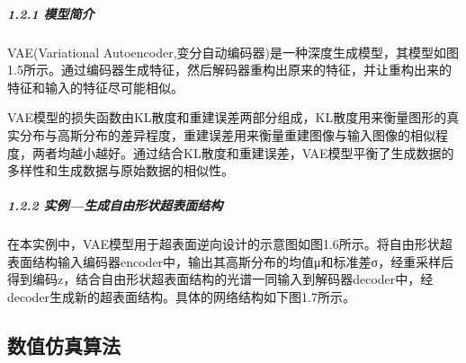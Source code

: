 \documentclass[a4paper,10pt,english]{sphinxmanual}
\begin{document}
\subparagraph{1.2.1 模型简介}
\label{\detokenize{_u7b80_u4ecb/_u6838_u5fc3_u8bbe_u8ba1_u4f18_u5316_u7b97_u6cd5/_u6df1_u5ea6_u5b66_u4e60_u6a21_u5757/_u6df1_u5ea6_u5b66_u4e60_u6a21_u578b:id7}}
\sphinxAtStartPar
VAE(Variational Autoencoder,变分自动编码器)是一种深度生成模型，其模型如图1.5所示。通过编码器生成特征，然后解码器重构出原来的特征，并让重构出来的特征和输入的特征尽可能相似。


\sphinxAtStartPar
{}





\sphinxAtStartPar
VAE模型的损失函数由KL散度和重建误差两部分组成，KL散度用来衡量图形的真实分布与高斯分布的差异程度，重建误差用来衡量重建图像与输入图像的相似程度，两者均越小越好。通过结合KL散度和重建误差，VAE模型平衡了生成数据的多样性和生成数据与原始数据的相似性。


\subparagraph{1.2.2 实例—生成自由形状超表面结构}
\label{\detokenize{_u7b80_u4ecb/_u6838_u5fc3_u8bbe_u8ba1_u4f18_u5316_u7b97_u6cd5/_u6df1_u5ea6_u5b66_u4e60_u6a21_u5757/_u6df1_u5ea6_u5b66_u4e60_u6a21_u578b:id8}}
\sphinxAtStartPar


\sphinxAtStartPar
{}





\sphinxAtStartPar
在本实例中，VAE模型用于超表面逆向设计的示意图如图1.6所示。将自由形状超表面结构输入编码器encoder中，输出其高斯分布的均值μ和标准差σ，经重采样后得到编码z，结合自由形状超表面结构的光谱一同输入到解码器decoder中，经decoder生成新的超表面结构。具体的网络结构如下图1.7所示。


\sphinxAtStartPar
{}







\sphinxstepscope


\subsection{数值仿真算法}
\label{\detokenize{_u7b80_u4ecb/_u6838_u5fc3_u8bbe_u8ba1_u4f18_u5316_u7b97_u6cd5/_u6570_u503c_u4eff_u771f_u6a21_u5757/_u6570_u503c_u4eff_u771f_u7b97_u6cd5:id1}}\label{\detokenize{_u7b80_u4ecb/_u6838_u5fc3_u8bbe_u8ba1_u4f18_u5316_u7b97_u6cd5/_u6570_u503c_u4eff_u771f_u6a21_u5757/_u6570_u503c_u4eff_u771f_u7b97_u6cd5::doc}}
\end{document}
